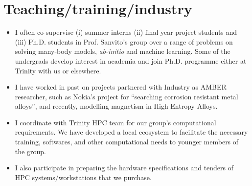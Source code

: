 \documentclass[10pt,a4paper,sans]{moderncv}        %
\begin{document}
\vspace{0.5cm}

\section{Teaching/training/industry}
\begin{itemize}
\item I often co-supervise (i) summer interns (ii) final year project students and (iii) Ph.D. students
  in Prof. Sanvito's group over a range of problems on solving many-body models, \textit{ab-initio} and machine learning.
  Some of the undergrads develop interest in academia and join Ph.D. programme either at Trinity with us or elsewhere.
  \vspace{0.3cm}
\item I have worked in past on projects partnered with Industry as AMBER researcher, such as Nokia's project for
  ``searching corrosion resistant metal alloys'', and recently, modelling magnetism in High Entropy Alloys.
  \vspace{0.3cm}
\item I coordinate with Trinity HPC team for our group's computational requirements. We have developed a local ecosystem
  to facilitate the necessary training, softwares, and other computational needs to younger members of the group.
  \vspace{0.3cm}
\item I also participate in preparing the hardware specifications and tenders of HPC systems/workstations that we purchase.
\end{itemize}
\end{document}
